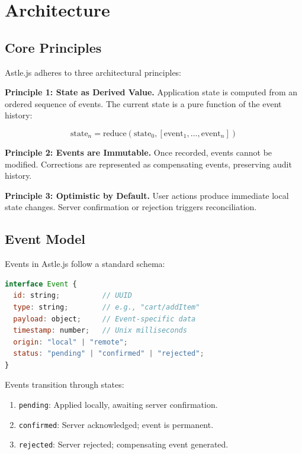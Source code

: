 \section{Architecture}


\subsection{Core Principles}

Astle.js adheres to three architectural principles:

\textbf{Principle 1: State as Derived Value.} Application state is computed from an ordered sequence of events. The current state is a pure function of the event history:

\begin{equation}
\text{state}_n = \text{reduce}(\text{state}_0, [\text{event}_1, \ldots, \text{event}_n])
\end{equation}

\textbf{Principle 2: Events are Immutable.} Once recorded, events cannot be modified. Corrections are represented as compensating events, preserving audit history.

\textbf{Principle 3: Optimistic by Default.} User actions produce immediate local state changes. Server confirmation or rejection triggers reconciliation.

\subsection{Event Model}

Events in Astle.js follow a standard schema:

\begin{lstlisting}[language=JavaScript,caption=Event schema]
interface Event {
  id: string;          // UUID
  type: string;        // e.g., "cart/addItem"
  payload: object;     // Event-specific data
  timestamp: number;   // Unix milliseconds
  origin: "local" | "remote";
  status: "pending" | "confirmed" | "rejected";
}
\end{lstlisting}

Events transition through states:
\begin{enumerate}
\item \texttt{pending}: Applied locally, awaiting server confirmation.
\item \texttt{confirmed}: Server acknowledged; event is permanent.
\item \texttt{rejected}: Server rejected; compensating event generated.
\end{enumerate}


